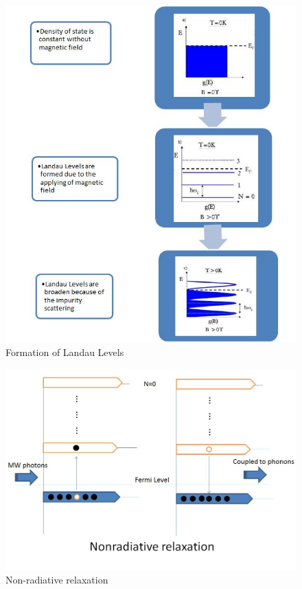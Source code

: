 \documentclass[12pt]{ruthesis}
\begin{document}
\begin{figure}
  \centering
  \includegraphics[scale=0.5]{figures/llformation.JPG}
  \caption{Formation of Landau Levels}
  \label{llformation}
\end{figure}
 
\begin{figure}
  \centering
  \includegraphics[scale=0.25]{figures/nonradiative.JPG}
  \caption{Non-radiative relaxation}
  \label{nonradiative}
\end{figure}
\end{document}
